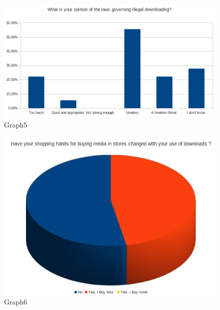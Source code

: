 \documentclass[a4paper]{article}
\begin{document}
\begin{figure}[htbp]
  \centering
  \includegraphics[scale=0.40]{graph5}
  \caption{Graph5}
  \label{fig:Graph5}
\end{figure}
\begin{figure}[htbp]
  \centering
  \includegraphics[scale=0.40]{graph6}
  \caption{Graph6}
  \label{fig:Graph6}
\end{figure}
\end{document}
